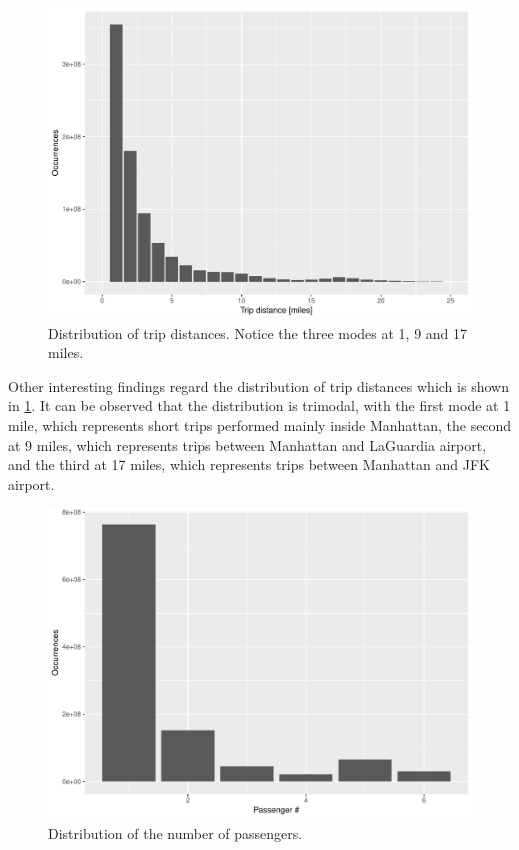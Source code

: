 \documentclass{acm_proc_article-sp-sigmod09}
\begin{document}
\begin{figure}
	\centering
	\includegraphics[width=1\columnwidth]{resources/base_plots/trip_distance_distr.pdf}
	\caption{Distribution of trip distances. Notice the three modes at 1, 9 and 17 miles.}
	\label{fig:tripDistanceDistr}
\end{figure}

Other interesting findings regard the distribution of trip distances which is shown in \cref{fig:tripDistanceDistr}. It can be observed that the distribution is trimodal, with the first mode at 1 mile, which represents short trips performed mainly inside Manhattan, the second at 9 miles, which represents trips between Manhattan and LaGuardia airport, and the third at 17 miles, which represents trips between Manhattan and JFK airport.

\begin{figure}
	\centering
	\includegraphics[width=1\columnwidth]{resources/base_plots/passenger_count_dist.pdf}
	\caption{Distribution of the number of passengers.}
	\label{fig:passengerCountDistr}
\end{figure}
\end{document}
